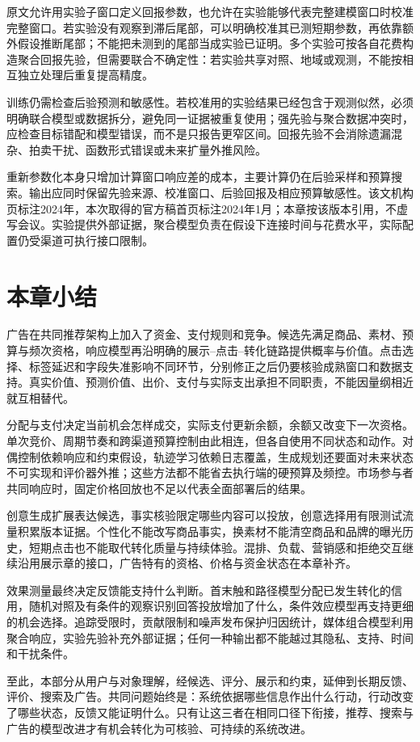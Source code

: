 原文允许用实验子窗口定义回报参数，也允许在实验能够代表完整建模窗口时校准完整窗口。若实验没有观察到滞后尾部，可以明确校准其已测短期参数，再依靠额外假设推断尾部；不能把未测到的尾部当成实验已证明。多个实验可按各自花费构造聚合回报先验，但需要联合不确定性：若实验共享对照、地域或观测，不能按相互独立处理后重复提高精度。

训练仍需检查后验预测和敏感性。若校准用的实验结果已经包含于观测似然，必须明确联合模型或数据拆分，避免同一证据被重复使用；强先验与聚合数据冲突时，应检查目标错配和模型错误，而不是只报告更窄区间。回报先验不会消除遗漏混杂、拍卖干扰、函数形式错误或未来扩量外推风险。

重新参数化本身只增加计算窗口响应差的成本，主要计算仍在后验采样和预算搜索。输出应同时保留先验来源、校准窗口、后验回报及相应预算敏感性。该文机构页标注2024年，本次取得的官方稿首页标注2024年1月；本章按该版本引用，不虚写会议。实验提供外部证据，聚合模型负责在假设下连接时间与花费水平，实际配置仍受渠道可执行接口限制。

\section{本章小结}
\label{sec:rs-advertising-summary}

广告在共同推荐架构上加入了资金、支付规则和竞争。候选先满足商品、素材、预算与频次资格，响应模型再沿明确的展示--点击--转化链路提供概率与价值。点击选择、标签延迟和字段失准影响不同环节，分别修正之后仍要核验成熟窗口和数据支持。真实价值、预测价值、出价、支付与实际支出承担不同职责，不能因量纲相近就互相替代。

分配与支付决定当前机会怎样成交，实际支付更新余额，余额又改变下一次资格。单次竞价、周期节奏和跨渠道预算控制由此相连，但各自使用不同状态和动作。对偶控制依赖响应和约束假设，轨迹学习依赖日志覆盖，生成规划还要面对未来状态不可实现和评价器外推；这些方法都不能省去执行端的硬预算及频控。市场参与者共同响应时，固定价格回放也不足以代表全面部署后的结果。

创意生成扩展表达候选，事实核验限定哪些内容可以投放，创意选择用有限测试流量积累版本证据。个性化不能改写商品事实，换素材不能清空商品和品牌的曝光历史，短期点击也不能取代转化质量与持续体验。混排、负载、营销感和拒绝交互继续沿用展示章的接口，广告特有的资格、价格与资金状态在本章补齐。

效果测量最终决定反馈能支持什么判断。首末触和路径模型分配已发生转化的信用，随机对照及有条件的观察识别回答投放增加了什么，条件效应模型再支持更细的机会选择。追踪受限时，贡献限制和噪声发布保护归因统计，媒体组合模型利用聚合响应，实验先验补充外部证据；任何一种输出都不能越过其隐私、支持、时间和干扰条件。

至此，本部分从用户与对象理解，经候选、评分、展示和约束，延伸到长期反馈、评价、搜索及广告。共同问题始终是：系统依据哪些信息作出什么行动，行动改变了哪些状态，反馈又能证明什么。只有让这三者在相同口径下衔接，推荐、搜索与广告的模型改进才有机会转化为可核验、可持续的系统改进。
